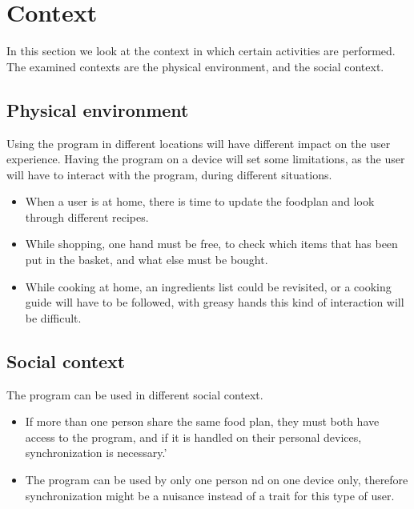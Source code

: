 \section{Context}
In this section we look at the context in which certain activities are performed. The examined contexts are the physical environment, and the social context.

\subsection{Physical environment}
Using the program in different locations will have different impact on the user experience. Having the program on a device will set some limitations, as the user will have to interact with the program, during different situations.
\begin{itemize}
\item When a user is at home, there is time to update the foodplan and look through different recipes.
\item While shopping, one hand must be free, to check which items that has been put in the basket, and what else must be bought.
\item While cooking at home, an ingredients list could be revisited, or a cooking guide will have to be followed, with greasy hands this kind of interaction will be difficult.
\end{itemize}

\subsection{Social context}
The program can be used in different social context.
\begin{itemize}
\item If more than one person share the same food plan, they must both have access to the program, and if it is handled on their personal devices, synchronization is necessary.'
\item The program can be used by only one person nd on one device only, therefore synchronization might be a nuisance instead of a trait for this type of user.
\end{itemize}
